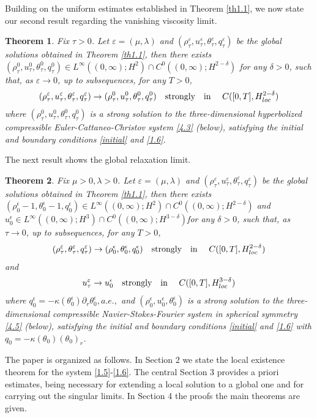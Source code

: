 \documentclass[11pt,reqno]{amsart}
\numberwithin{equation}{section}
\newtheorem{theorem}{Theorem}[section]
\begin{document}
Building on the uniform estimates established in Theorem \ref{th1.1}, we now state our second result regarding the vanishing viscosity limit.
\begin{theorem}\label{th1.2}
 Fix $\tau>0$. Let $\varepsilon=( \mu, \lambda)$ and $(\rho_\tau^\varepsilon, u_\tau^\varepsilon, \theta_\tau^\varepsilon, q_\tau^\varepsilon)$ be the global solutions obtained in Theorem \ref{th1.1}, then there exists
$( \rho_\tau^0,  u_\tau^0,  \theta_\tau^0, q_\tau^0)\in L^\infty((0,\infty); H^2 ) \cap C^0((0,\infty); H^{2-\delta}) $ for any $\delta>0$, such that, as $\varepsilon\rightarrow 0$, up to subsequences, for any $T>0$,
 \begin{align}
(\rho_\tau^\varepsilon, u_\tau^\varepsilon, \theta_\tau^\varepsilon, q_\tau^\varepsilon) \rightarrow (\rho_\tau^0, u_\tau^0, \theta_\tau^0, q_\tau^0) \quad \mbox{\rm  strongly\quad in } \quad C([0,T],H_{loc}^{2-\delta} )
\end{align}
where $( \rho_\tau^0,  u_\tau^0,  \theta_\tau^0, q_\tau^0)$ is a strong solution to the three-dimensional hyperbolized compressible Euler-Cattaneo-Christov system \eqref{4.3} (below), satisfying the initial and boundary conditions \eqref{initial} and \eqref{1.6}.
\end{theorem}

The next result shows the global relaxation limit.
\begin{theorem}\label{th1.3}
Fix $\mu>0, \lambda>0$. Let $\varepsilon=( \mu, \lambda)$  and  $(\rho_\tau^\varepsilon, u_\tau^\varepsilon, \theta_\tau^\varepsilon, q_\tau^\varepsilon)$  be the global solutions obtained in Theorem \ref{th1.1}, then there exists
$(\rho_0^\epsilon-1, \theta_0^\epsilon-1, q_0^\epsilon)\in L^\infty((0,\infty); H^2 ) \cap C^0((0,\infty); H^{2-\delta} )$ and $u_0^\epsilon \in  L^\infty((0,\infty); H^3 ) \cap C^0((0,\infty); H^{3-\delta} )$for any $\delta>0$, such that, as $\tau\rightarrow 0$, up to subsequences, for any $T>0$,
 \begin{align}
(\rho_\tau^\varepsilon, \theta_\tau^\varepsilon, q_\tau^\varepsilon) \rightarrow (\rho_0^\epsilon, \theta_0^\epsilon, q_0^\epsilon) \quad \mbox{\rm  strongly\quad in } \quad C([0,T],H_{loc}^{2-\delta} )
\end{align}
and
\[
 u_\tau^\varepsilon  \rightarrow u_0^\epsilon \quad \mbox{\rm  strongly\quad in } \quad C([0,T],H_{loc}^{3-\delta} )
 \]
where $q_0^\epsilon=-\kappa(\theta_0^\epsilon) \partial_r \theta_0^\epsilon, a.e., $ and $( \rho_0^\epsilon, u_0^\epsilon, \theta_0^\epsilon)$ is a strong solution to the three-dimensional compressible Navier-Stokes-Fourier system in spherical symmetry \eqref{4.5} (below), satisfying the initial and boundary conditions \eqref{initial} and \eqref{1.6} with $q_0=-\kappa(\theta_0)(\theta_0)_r$.
\end{theorem}
The paper is organized as follows. In Section 2 we state the local existence theorem for the system \eqref{1.5}-\eqref{1.6}. The central Section 3 provides a priori estimates, being necessary for extending a local solution to a global one and for carrying out the singular limits. In Section 4 the proofs the main theorems are given.
\end{document}
